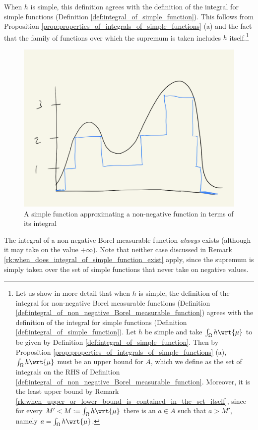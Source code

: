\documentclass{article} %
\begin{document}
When $h$ is simple, this definition agrees with the definition of the integral for simple functions (Definition \ref{def:integral_of_simple_function}). This follows from Proposition \ref{prop:properties_of_integrals_of_simple_functions} (a) and the fact that the family of functions over which the supremum is taken includes $h$ itself.\footnote{Let us show in more detail that when $h$ is simple, the definition of the integral for non-negative Borel measurable functions (Definition \ref{def:integral_of_non_negative_Borel_measurable_function}) agrees with the definition of the integral for simple functions (Definition \ref{def:integral_of_simple_function}).  Let $h$ be simple and take $\int_{\Omega} h \wrt{\mu}$ to be given by Definition \ref{def:integral_of_simple_function}. Then by Proposition \ref{prop:properties_of_integrals_of_simple_functions} (a), $\int_{\Omega} h \wrt{\mu}$ must be an upper bound for  $A$, which we define as the set of integrals on the RHS of  Definition \ref{def:integral_of_non_negative_Borel_measurable_function}.  Moreover, it is the least upper bound by Remark \ref{rk:when_upper_or_lower_bound_is_contained_in_the_set_itself}, since for every $M' < M:= \int_{\Omega} h \wrt{\mu}$ there is an $a \in A$ such that $a>M'$, namely $a=\int_{\Omega} h \wrt{\mu}$.} 

\begin{figure}[H]
\centering
\includegraphics[width=.4\textwidth]{images/simple_function_approximating_non_negative_function}	
\caption{A simple function approximating a non-negative function in terms of its integral}
\end{figure}

\begin{remark}{}
The integral of a non-negative Borel measurable function \textit{always} exists (although it may take on the value $+\infty$).  Note that neither case discussed in Remark \ref{rk:when_does_integral_of_simple_function_exist} apply, since the supremum is simply taken over the set of simple functions that never take on negative values. 
\label{rk:when_does_integral_of_non_negative_Borel_measurable_function_exist}
\end{remark}
\end{document}
